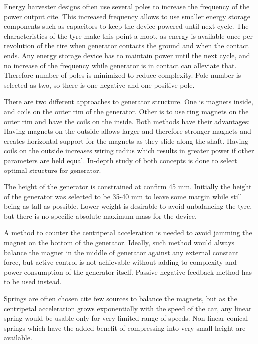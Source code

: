 Energy harvester designs often use several poles to increase the frequency of the power output {\color{red}cite}. This increased frequency allows to use smaller energy storage components such as capacitors to keep the device powered until next cycle. The characteristics of the tyre make this point a moot, as energy is available once per revolution of the tire when generator contacts the ground and when the contact ends. Any energy storage device has to maintain power until the next cycle, and no increase of the frequency while generator is in contact can alleviate that. Therefore number of poles is minimized to reduce complexity. Pole number is selected as two, so there is one negative and one positive pole. 

There are two different approaches to generator structure. One is magnets inside, and coils on the outer rim of the generator. Other is to use ring magnets on the outer rim and have the coils on the inside. Both methods have their advantages: Having magnets on the outside allows larger and therefore stronger magnets and creates horizontal support for the magnets as they slide along the shaft. Having coils on the outside increases wiring radius which results in greater power if other parameters are held equal. In-depth study of both concepts is done to select optimal structure for generator. 

The height of the generator is constrained at  {\color{yellow} confirm} 45 mm. Initially the height of {\color{gray} the} generator was selected to be 35-40 mm to leave some margin while still being as tall as possible. Lower weight is desirable to avoid unbalancing the tyre, but there is no specific absolute maximum mass for the device. 

A method to counter the centripetal acceleration is needed to avoid jamming the magnet on the bottom of the generator. Ideally, such method would always balance the magnet in the middle of generator against any external constant force, but active control is not achievable without adding to complexity and power consumption of the generator itself. Passive negative feedback method has to be used instead. 

Springs are often chosen {\color{red} cite few sources} to balance the magnets, but as the centripetal acceleration grows exponentially with the speed of the car, any linear spring would be usable only for very limited range of speeds. Non-linear conical springs which have the added benefit of compressing into very small height are available.

